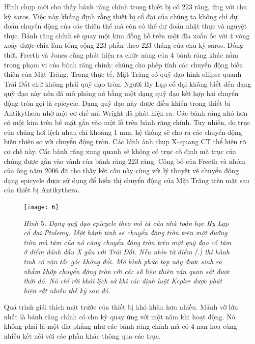 \begin{multicols}{2}
	\vskip 0.1cm
	Hình chụp mới cho thấy bánh răng chính trong thiết bị có $223$ răng, ứng với chu kỳ saros. Việc này khẳng định rằng thiết bị cổ đại của chúng ta không chỉ dự đoán chuyển động của các thiên thể mà còn có thể dự đoán nhật thực và nguyệt thực. Bánh răng chính sẽ quay một kim đồng hồ trên một đĩa xoắn ốc với $4$ vòng xoáy được chia làm tổng cộng $223$ phần theo $223$ tháng của chu kỳ {saros}. Đồng thời, Freeth và Jones cũng phát hiện ra chức năng của $4$ bánh răng khác nằm trong phạm vi của bánh răng chính: chúng cho phép tính các chuyển động biến thiên của Mặt Trăng. Trong thực tế, Mặt Trăng có quỹ đạo hình ellipse quanh Trái Đất chứ không phải quỹ đạo tròn. Người Hy Lạp cổ đại không biết đến dạng quỹ đạo này nên đã mô phỏng nó bằng một dạng quỹ đạo kết hợp hai chuyển động tròn gọi là epicycle.
	\vskip 0.1cm
	Dạng quỹ đạo này được điều khiển trong thiết bị Antikythera nhờ một cơ chế mà Wright đã phát hiện ra. Các bánh răng nhỏ hơn có một kim trên bề mặt gắn vào một lỗ trên bánh răng chính. Tuy nhiên, do trục của chúng hơi lệch nhau chỉ khoảng $1$ mm, hệ thống sẽ cho ra các chuyển động biến thiên so với chuyển động tròn. Các hình ảnh chụp X--quang CT thể hiện rõ cơ chế này. Các bánh răng xung quanh sẽ không có trục cố định mà trục của chúng được gắn vào vành của bánh răng $223$ răng. Công bố của Freeth và nhóm của ông năm $2006$ đã cho thấy kết cấu này cùng với lý thuyết về chuyển động dạng epicycle được sử dụng để hiển thị chuyển động của Mặt Trăng trên mặt sau của thiết bị Antikythera.
	\begin{figure}[H]
		\vspace*{-5pt}
		\centering
		\captionsetup{labelformat= empty, justification=centering}
		\texttt{[image: 6]}
		\caption{\small\textit{\color{lichsutoanhoc}Hình $5$. Dạng quỹ đạo epicycle theo mô tả của nhà toán học Hy Lạp cổ đại Ptolemy. Một hành tinh sẽ chuyển động tròn trên một đường tròn mà tâm của nó cũng chuyển động tròn trên một quỹ đạo có tâm ở điểm đánh dấu X gần với Trái Đất. Nếu nhìn từ điểm (.) thì hành tinh có vận tốc góc không đổi. Mô hình phức tạp này được sinh ra nhằm khớp chuyển động tròn với các số liệu thiên văn quan sát được thời đó. Nó chỉ rời khỏi lịch sử khi các định luật Kepler được phát hiện rất nhiều thế kỷ sau đó.}}
		\vspace*{-10pt}
	\end{figure}
	Quá trình giải thích mặt trước của thiết bị khó khăn hơn nhiều. Mảnh vỡ lớn nhất là bánh răng chính có chu kỳ quay ứng với một năm khi hoạt động. Nó không phải là một đĩa phẳng như các bánh răng chính mà có $4$ nan hoa cùng nhiều kết nối với các phần khác thông qua các trục.

\end{multicols}
